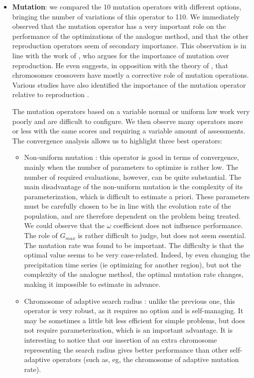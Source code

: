 \documentclass[twocol]{ametsoc}
\begin{document}
\begin{itemize}
	\item \textbf{Mutation}: we compared the 10 mutation operators with different options, bringing the number of variations of this operator to 110. We immediately observed that the mutation operator has a very important role on the performance of the optimizations of the analogue method, and that the other reproduction operators seem of secondary importance. This observation is in line with the work of \citet{Back1996a}, who argues for the importance of mutation over reproduction. He even suggests, in opposition with the theory of \citet{Holland1992a}, that chromosomes crossovers have mostly a corrective role of mutation operations. Various studies have also identified the importance of the mutation operator relative to reproduction \citep[see eg.][]{Back1992a, Back1996b, Smith1997a, Deb1999, Haupt2004, Costa2005a, Costa2007a}.
	
	The mutation operators based on a variable normal or uniform law work very poorly and are difficult to configure. We then observe many operators more or less with the same scores and requiring a variable amount of assessments. The convergence analysis allows us to highlight three best operators:
	
	\begin{itemize}
		\item Non-uniform mutation \citep{Michalewicz1996}: this operator is good in terms of convergence, mainly when the number of parameters to optimize is rather low. The number of required evaluations, however, can be quite substantial. The main disadvantage of the non-uniform mutation is the complexity of its parameterization, which is difficult to estimate a priori. These parameters must be carefully chosen to be in line with the evolution rate of the population, and are therefore dependent on the problem being treated. We could observe that the $\omega$ coefficient does not influence performance. The role of $G_{max}$ is rather difficult to judge, but does not seem essential. The mutation rate was found to be important. The difficulty is that the optimal value seems to be very case-related. Indeed, by even changing the precipitation time series (ie optimizing for another region), but not the complexity of the analogue method, the optimal mutation rate changes, making it impossible to estimate in advance.
		
		\item Chromosome of adaptive search radius \citep{Horton2012a}: unlike the previous one, this operator is very robust, as it requires no option and is self-managing. It may be sometimes a little bit less efficient for simple problems, but does not require parameterization, which is an important advantage. It is interesting to notice that our insertion of an extra chromosome representing the search radius gives better performance than other self-adaptive operators (such as, eg, the chromosome of adaptive mutation rate).
		

\end{itemize}
\end{itemize}
\end{document}
